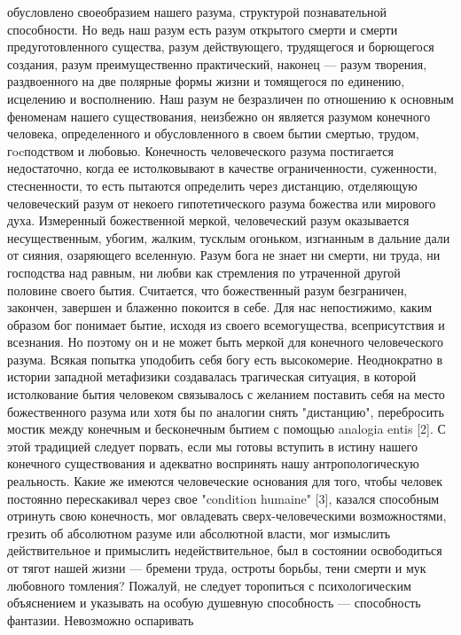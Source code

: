 \documentclass[12pt]{article}
\begin{document}
обусловлено своеобразием нашего разума, структурой познавательной способности. Но ведь наш разум есть
разум  открытого  смерти  и  смерти  предуготовленного  существа,  разум  действующего,  трудящегося  и
борющегося создания, разум преимущественно практический, наконец --- разум творения, раздвоенного на две
полярные формы жизни и томящегося по единению, исцелению и восполнению. Наш разум не безразличен по
отношению  к  основным  феноменам  нашего  существования,  неизбежно  он  является  разумом  конечного
человека,  определенного  и  обусловленного  в  своем  бытии  смертью,  трудом,  гocподством  и  любовью.
Конечность  человеческого  разума  постигается  недостаточно,  когда  ее  истолковывают  в  качестве
ограниченности,  суженности,  стесненности,  то  есть  пытаются  определить  через  дистанцию,  отделяющую
человеческий  разум  от  некоего  гипотетического  разума  божества  или  мирового  духа.  Измеренный
божественной меркой, человеческий разум оказывается несущественным, убогим, жалким, тусклым огоньком,
изгнанным в дальние дали от сияния, озаряющего вселенную. Разум бога не знает ни смерти, ни труда, ни
господства над равным, ни любви как стремления по утраченной другой половине своего бытия. Считается, что
божественный разум безграничен, закончен, завершен и блаженно покоится в себе. Для нас непостижимо,
каким образом бог понимает бытие, исходя из своего всемогущества, всеприсутствия и всезнания. Но поэтому
он и не может быть меркой для конечного человеческого разума. Всякая попытка уподобить себя богу есть
высокомерие.  Неоднократно  в  истории  западной  метафизики  создавалась  трагическая  ситуация,  в  которой
истолкование бытия человеком связывалось с желанием поставить себя на место божественного разума или хотя
бы по аналогии снять "дистанцию", перебросить мостик между конечным и бесконечным бытием с помощью
analogia entis [2]. С этой традицией следует порвать, если мы готовы вступить в истину нашего конечного
существования и адекватно воспринять нашу антропологическую реальность.
Какие  же  имеются  человеческие  основания  для  того,  чтобы  человек  постоянно  перескакивал  через  свое
"condition humaine" [3], казался способным отринуть свою конечность, мог овладевать сверх-человеческими
возможностями,  грезить  об  абсолютном  разуме  или  абсолютной  власти,  мог  измыслить  действительное  и
примыслить недействительное, был в состоянии освободиться от тягот нашей жизни --- бремени труда, остроты
борьбы,  тени  смерти  и  мук  любовного  томления?  Пожалуй,  не  следует  торопиться  с  психологическим
объяснением и указывать на особую душевную способность --- способность фантазии. Невозможно оспаривать
\end{document}
